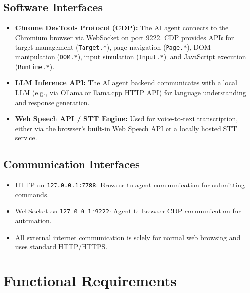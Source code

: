 \subsection{Software Interfaces}
\begin{itemize}[leftmargin=*]
    \item \textbf{Chrome DevTools Protocol (CDP):} The AI agent connects to the Chromium browser via WebSocket on port 9222. CDP provides APIs for target management (\texttt{Target.*}), page navigation (\texttt{Page.*}), DOM manipulation (\texttt{DOM.*}), input simulation (\texttt{Input.*}), and JavaScript execution (\texttt{Runtime.*}).
    \item \textbf{LLM Inference API:} The AI agent backend communicates with a local LLM (e.g., via Ollama or llama.cpp HTTP API) for language understanding and response generation.
    \item \textbf{Web Speech API / STT Engine:} Used for voice-to-text transcription, either via the browser's built-in Web Speech API or a locally hosted STT service.
\end{itemize}

\subsection{Communication Interfaces}
\begin{itemize}[leftmargin=*]
    \item HTTP on \texttt{127.0.0.1:7788}: Browser-to-agent communication for submitting commands.
    \item WebSocket on \texttt{127.0.0.1:9222}: Agent-to-browser CDP communication for automation.
    \item All external internet communication is solely for normal web browsing and uses standard HTTP/HTTPS.
\end{itemize}

\section{Functional Requirements}

\needspace{7cm}
